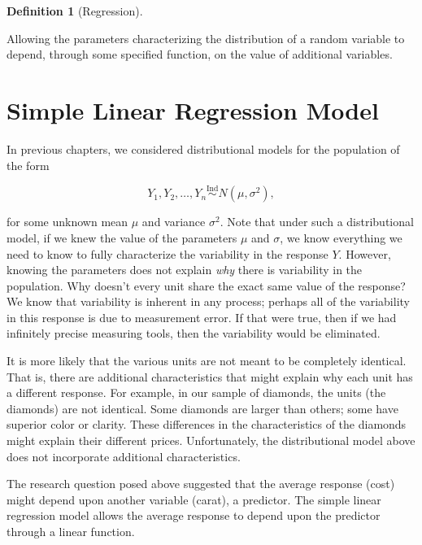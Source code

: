 \documentclass[
  letterpaper,
  DIV=11,
  numbers=noendperiod]{scrreprt}
\theoremstyle{plain}
\theoremstyle{definition}
\newtheorem{definition}{Definition}[chapter]
\theoremstyle{definition}
\theoremstyle{remark}
\begin{document}
\begin{definition}[Regression]\protect\hypertarget{def-regression}{}\label{def-regression}

Allowing the parameters characterizing the distribution of a random
variable to depend, through some specified function, on the value of
additional variables.

\end{definition}

\hypertarget{simple-linear-regression-model}{%
\section{Simple Linear Regression
Model}\label{simple-linear-regression-model}}

In previous chapters, we considered distributional models for the
population of the form

\[Y_1, Y_2, \dotsc, Y_n \stackrel{\text{Ind}}{\sim} N\left(\mu, \sigma^2\right),\]

for some unknown mean \(\mu\) and variance \(\sigma^2\). Note that under
such a distributional model, if we knew the value of the parameters
\(\mu\) and \(\sigma\), we know everything we need to know to fully
characterize the variability in the response \(Y\). However, knowing the
parameters does not explain \emph{why} there is variability in the
population. Why doesn't every unit share the exact same value of the
response? We know that variability is inherent in any process; perhaps
all of the variability in this response is due to measurement error. If
that were true, then if we had infinitely precise measuring tools, then
the variability would be eliminated.

It is more likely that the various units are not meant to be completely
identical. That is, there are additional characteristics that might
explain why each unit has a different response. For example, in our
sample of diamonds, the units (the diamonds) are not identical. Some
diamonds are larger than others; some have superior color or clarity.
These differences in the characteristics of the diamonds might explain
their different prices. Unfortunately, the distributional model above
does not incorporate additional characteristics.

The research question posed above suggested that the average response
(cost) might depend upon another variable (carat), a predictor. The
simple linear regression model allows the average response to depend
upon the predictor through a linear function.
\end{document}
